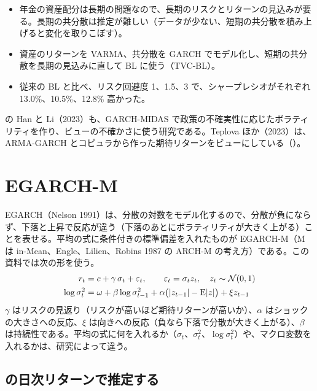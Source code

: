 \begin{paperbox}
\begin{itemize}
\item 年金の資産配分は長期の問題なので、長期のリスクとリターンの見込みが要る。長期の共分散は推定が難しい（データが少ない、短期の共分散を積み上げると変化を取りこぼす）。
\item 資産のリターンを VARMA、共分散を GARCH でモデル化し、短期の共分散を長期の見込みに直して BL に使う（TVC-BL）。
\item 従来の BL と比べ、リスク回避度 1、1.5、3 で、シャープレシオがそれぞれ 13.0\%、10.5\%、12.8\% 高かった。
\end{itemize}
\end{paperbox}

 の Han と Li（2023）も、GARCH-MIDAS で政策の不確実性に応じたボラティリティを作り、ビューの不確かさに使う研究である。Teplova ほか（2023）は、ARMA-GARCH とコピュラから作った期待リターンをビューにしている（）。

\section{EGARCH-M}

EGARCH（Nelson 1991）は、分散の対数をモデル化するので、分散が負にならず、下落と上昇で反応が違う（下落のあとにボラティリティが大きく上がる）ことを表せる。平均の式に条件付きの標準偏差を入れたものが EGARCH-M（M は in-Mean、Engle、Lilien、Robins 1987 の ARCH-M の考え方）である。この資料では次の形を使う。
\begin{align}
r_t&=c+\gamma\,\sigma_t+\varepsilon_t,\qquad \varepsilon_t=\sigma_tz_t,\quad z_t\sim\mathcal N(0,1)\label{eq:egarch-mean}\\
\log\sigma_t^2&=\omega+\beta\log\sigma_{t-1}^2+\alpha\bigl(|z_{t-1}|-\mathrm{E}|z|\bigr)+\xi z_{t-1}\label{eq:egarch-var}
\end{align}
$\gamma$ はリスクの見返り（リスクが高いほど期待リターンが高いか）、$\alpha$ はショックの大きさへの反応、$\xi$ は向きへの反応（負なら下落で分散が大きく上がる）、$\beta$ は持続性である。平均の式に何を入れるか（$\sigma_t$、$\sigma_t^2$、$\log\sigma_t^2$）や、マクロ変数を入れるかは、研究によって違う。

\subsection*{\SP{} の日次リターンで推定する}

